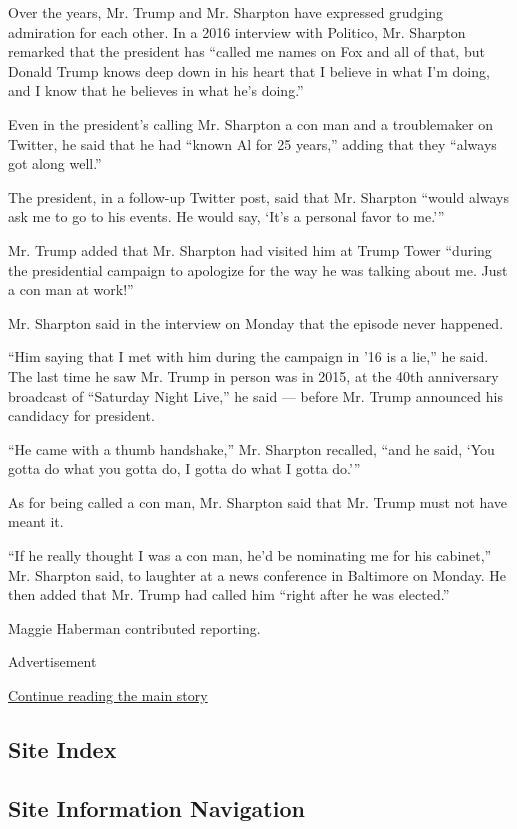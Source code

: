 Over the years, Mr. Trump and Mr. Sharpton have expressed grudging
admiration for each other. In a 2016 interview with Politico, Mr.
Sharpton remarked that the president has ``called me names on Fox and
all of that, but Donald Trump knows deep down in his heart that I
believe in what I'm doing, and I know that he believes in what he's
doing.''

Even in the president's calling Mr. Sharpton a con man and a
troublemaker on Twitter, he said that he had ``known Al for 25 years,''
adding that they ``always got along well.''

The president, in a follow-up Twitter post, said that Mr. Sharpton
``would always ask me to go to his events. He would say, `It's a
personal favor to me.'''

Mr. Trump added that Mr. Sharpton had visited him at Trump Tower
``during the presidential campaign to apologize for the way he was
talking about me. Just a con man at work!''

Mr. Sharpton said in the interview on Monday that the episode never
happened.

``Him saying that I met with him during the campaign in '16 is a lie,''
he said. The last time he saw Mr. Trump in person was in 2015, at the
40th anniversary broadcast of ``Saturday Night Live,'' he said ---
before Mr. Trump announced his candidacy for president.

``He came with a thumb handshake,'' Mr. Sharpton recalled, ``and he
said, `You gotta do what you gotta do, I gotta do what I gotta do.'''

As for being called a con man, Mr. Sharpton said that Mr. Trump must not
have meant it.

``If he really thought I was a con man, he'd be nominating me for his
cabinet,'' Mr. Sharpton said, to laughter at a news conference in
Baltimore on Monday. He then added that Mr. Trump had called him ``right
after he was elected.''

Maggie Haberman contributed reporting.

Advertisement

\protect\hyperlink{after-bottom}{Continue reading the main story}

\hypertarget{site-index}{%
\subsection{Site Index}\label{site-index}}

\hypertarget{site-information-navigation}{%
\subsection{Site Information
Navigation}\label{site-information-navigation}}

